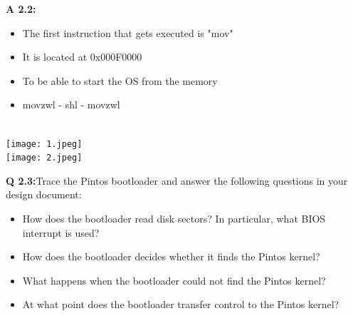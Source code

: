 \documentclass[a4paper,11pt]{paper}
\begin{document}
\textbf{A 2.2:}
\begin{itemize}
    \item The first instruction that gets executed is "mov"
    \item It is located at 0x000F0000
    \item To be able to start the OS from the memory 
    \item movzwl - shl - movzwl
    
\end{itemize}
\\
\texttt{[image: 1.jpeg]}
\\
\texttt{[image: 2.jpeg]}



\textbf{Q 2.3:}Trace the Pintos bootloader and answer the following questions in your design document:
\begin{itemize}
    \item How does the bootloader read disk sectors? In particular, what BIOS interrupt is used?
    \item How does the bootloader decides whether it finds the Pintos kernel?
    \item What happens when the bootloader could not find the Pintos kernel?
    \item At what point does the bootloader transfer control to the Pintos kernel?
\end{itemize}
\end{document}
